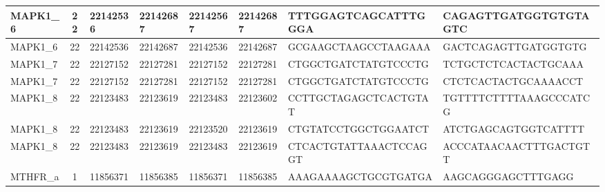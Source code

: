 \begin{landscape}
\begin{longtable}{| p{} | p{} | p{} | p{} | p{} | p{} | p{} | p{} |}
\multicolumn{1}{|l|}{MAPK1\_6}   & \multicolumn{1}{c|}{22} & \multicolumn{1}{l|}{22142536}  & \multicolumn{1}{l|}{22142687}  & \multicolumn{1}{l|}{22142567}  & \multicolumn{1}{l|}{22142687}  & \multicolumn{1}{l|}{TTTGGAGTCAGCATTTGGGA}            & \multicolumn{1}{l|}{CAGAGTTGATGGTGTGTAGTC}         \\ \hline
\multicolumn{1}{|l|}{MAPK1\_6}   & \multicolumn{1}{c|}{22} & \multicolumn{1}{l|}{22142536}  & \multicolumn{1}{l|}{22142687}  & \multicolumn{1}{l|}{22142536}  & \multicolumn{1}{l|}{22142687}  & \multicolumn{1}{l|}{GCGAAGCTAAGCCTAAGAAA}            & \multicolumn{1}{l|}{GACTCAGAGTTGATGGTGTG}          \\ \hline
\multicolumn{1}{|l|}{MAPK1\_7}   & \multicolumn{1}{c|}{22} & \multicolumn{1}{l|}{22127152}  & \multicolumn{1}{l|}{22127281}  & \multicolumn{1}{l|}{22127152}  & \multicolumn{1}{l|}{22127281}  & \multicolumn{1}{l|}{CTGGCTGATCTATGTCCCTG}            & \multicolumn{1}{l|}{TCTGCTCTCACTACTGCAAA}          \\ \hline
\multicolumn{1}{|l|}{MAPK1\_7}   & \multicolumn{1}{c|}{22} & \multicolumn{1}{l|}{22127152}  & \multicolumn{1}{l|}{22127281}  & \multicolumn{1}{l|}{22127152}  & \multicolumn{1}{l|}{22127281}  & \multicolumn{1}{l|}{CTGGCTGATCTATGTCCCTG}            & \multicolumn{1}{l|}{CTCTCACTACTGCAAAACCT}          \\ \hline
\multicolumn{1}{|l|}{MAPK1\_8}   & \multicolumn{1}{c|}{22} & \multicolumn{1}{l|}{22123483}  & \multicolumn{1}{l|}{22123619}  & \multicolumn{1}{l|}{22123483}  & \multicolumn{1}{l|}{22123602}  & \multicolumn{1}{l|}{CCTTGCTAGAGCTCACTGTAT}           & \multicolumn{1}{l|}{TGTTTTCTTTTAAAGCCCATCG}        \\ \hline
\multicolumn{1}{|l|}{MAPK1\_8}   & \multicolumn{1}{c|}{22} & \multicolumn{1}{l|}{22123483}  & \multicolumn{1}{l|}{22123619}  & \multicolumn{1}{l|}{22123520}  & \multicolumn{1}{l|}{22123619}  & \multicolumn{1}{l|}{CTGTATCCTGGCTGGAATCT}            & \multicolumn{1}{l|}{ATCTGAGCAGTGGTCATTTT}          \\ \hline
\multicolumn{1}{|l|}{MAPK1\_8}   & \multicolumn{1}{c|}{22} & \multicolumn{1}{l|}{22123483}  & \multicolumn{1}{l|}{22123619}  & \multicolumn{1}{l|}{22123483}  & \multicolumn{1}{l|}{22123619}  & \multicolumn{1}{l|}{CTCACTGTATTAAACTCCAGGT}          & \multicolumn{1}{l|}{ACCCATAACAACTTTGACTGTT}        \\ \hline
\multicolumn{1}{|l|}{MTHFR\_a}   & \multicolumn{1}{c|}{1}  & \multicolumn{1}{l|}{11856371}  & \multicolumn{1}{l|}{11856385}  & \multicolumn{1}{l|}{11856371}  & \multicolumn{1}{l|}{11856385}  & \multicolumn{1}{l|}{AAAGAAAAGCTGCGTGATGA}            & \multicolumn{1}{l|}{AAGCAGGGAGCTTTGAGG}            \\ \hline

\end{longtable}
\end{landscape}
